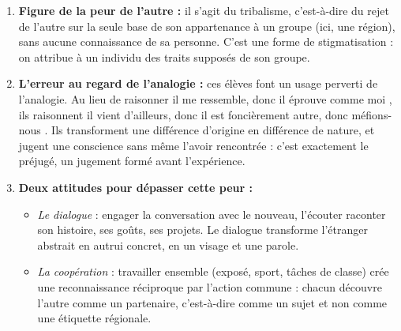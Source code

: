 \documentclass[11pt]{article}
\newcommand{\cle}[1]{{\popxbold\color{popdark}#1}}
\begin{document}
\begin{corrige}
\begin{enumerate}
\item \textbf{Figure de la peur de l'autre :} il s'agit du \cle{tribalisme}, c'est-à-dire du rejet de l'autre sur la seule base de son appartenance à un groupe (ici, une région), sans aucune connaissance de sa personne. C'est une forme de stigmatisation : on attribue à un individu des traits supposés de son groupe.
\item \textbf{L'erreur au regard de l'analogie :} ces élèves font un usage perverti de l'analogie. Au lieu de raisonner \guillemotleft il me ressemble, donc il éprouve comme moi \guillemotright, ils raisonnent \guillemotleft il vient d'ailleurs, donc il est foncièrement autre, donc méfions-nous \guillemotright. Ils transforment une différence d'origine en différence de nature, et jugent une conscience sans même l'avoir rencontrée : c'est exactement le préjugé, un jugement formé avant l'expérience.
\item \textbf{Deux attitudes pour dépasser cette peur :}
\begin{itemize}
\item \emph{Le dialogue} : engager la conversation avec le nouveau, l'écouter raconter son histoire, ses goûts, ses projets. Le dialogue transforme l'étranger abstrait en autrui concret, en un visage et une parole.
\item \emph{La coopération} : travailler ensemble (exposé, sport, tâches de classe) crée une reconnaissance réciproque par l'action commune : chacun découvre l'autre comme un partenaire, c'est-à-dire comme un sujet et non comme une étiquette régionale.
\end{itemize}
\end{enumerate}
\end{corrige}
\end{document}
